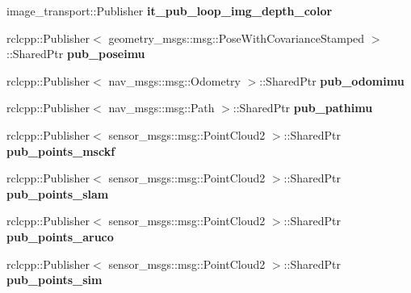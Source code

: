 \begin{DoxyCompactItemize}
\item 
\mbox{\label{classov__msckf_1_1ROS2Visualizer_adaab99aff6b181693836079d514e970c}} 
image\+\_\+transport\+::\+Publisher {\bfseries it\+\_\+pub\+\_\+loop\+\_\+img\+\_\+depth\+\_\+color}
\item 
\mbox{\label{classov__msckf_1_1ROS2Visualizer_a2e0333a4027decaae3ab8c210b835520}} 
rclcpp\+::\+Publisher$<$ geometry\+\_\+msgs\+::msg\+::\+Pose\+With\+Covariance\+Stamped $>$\+::Shared\+Ptr {\bfseries pub\+\_\+poseimu}
\item 
\mbox{\label{classov__msckf_1_1ROS2Visualizer_aabdd27c2f0ae0291c56234ce345eaf02}} 
rclcpp\+::\+Publisher$<$ nav\+\_\+msgs\+::msg\+::\+Odometry $>$\+::Shared\+Ptr {\bfseries pub\+\_\+odomimu}
\item 
\mbox{\label{classov__msckf_1_1ROS2Visualizer_a9cf451f56efe79d966718b6376e5454b}} 
rclcpp\+::\+Publisher$<$ nav\+\_\+msgs\+::msg\+::\+Path $>$\+::Shared\+Ptr {\bfseries pub\+\_\+pathimu}
\item 
\mbox{\label{classov__msckf_1_1ROS2Visualizer_af602ad0cdf872a08970bce90c8b0ccfc}} 
rclcpp\+::\+Publisher$<$ sensor\+\_\+msgs\+::msg\+::\+Point\+Cloud2 $>$\+::Shared\+Ptr {\bfseries pub\+\_\+points\+\_\+msckf}
\item 
\mbox{\label{classov__msckf_1_1ROS2Visualizer_ac69907ff6909bebcd2a9d67a8092d666}} 
rclcpp\+::\+Publisher$<$ sensor\+\_\+msgs\+::msg\+::\+Point\+Cloud2 $>$\+::Shared\+Ptr {\bfseries pub\+\_\+points\+\_\+slam}
\item 
\mbox{\label{classov__msckf_1_1ROS2Visualizer_a02a2150a20bb8abe7e6e784b3f7f6869}} 
rclcpp\+::\+Publisher$<$ sensor\+\_\+msgs\+::msg\+::\+Point\+Cloud2 $>$\+::Shared\+Ptr {\bfseries pub\+\_\+points\+\_\+aruco}
\item 
\mbox{\label{classov__msckf_1_1ROS2Visualizer_a4116383a9499536ec9f1d14850ba6cb4}} 
rclcpp\+::\+Publisher$<$ sensor\+\_\+msgs\+::msg\+::\+Point\+Cloud2 $>$\+::Shared\+Ptr {\bfseries pub\+\_\+points\+\_\+sim}

\end{DoxyCompactItemize}
